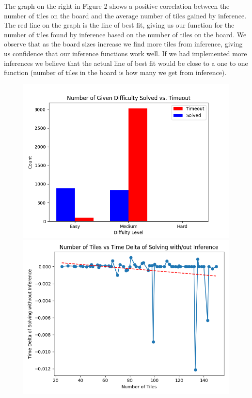 \documentclass{article}
\theoremstyle{definition}
\begin{document}
The graph on the right in Figure 2 shows a positive correlation between the number of tiles on the board and the average number of tiles gained by inference. The red line on the graph is the line of best fit, giving us our function for the number of tiles found by inference based on the number of tiles on the board. We observe that as the board sizes increase we find more tiles from inference, giving us confidence that our inference functions work well. If we had implemented more inferences we believe that the actual line of best fit would be close to a one to one function (number of tiles in the board is how many we get from inference).

\begin{figure}[H]
\begin{minipage}{0.49\textwidth}
    \centering
    \includegraphics[width=1\linewidth]{num_of_difficulty_solved.png}
\end{minipage}
\begin{minipage}{0.49\textwidth}
    \centering
    \includegraphics[width=1\linewidth]{num_tiles_vs_delta.png}

\end{minipage}
\end{figure}
\end{document}
